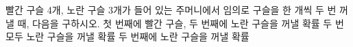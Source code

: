 빨간 구슬 4개, 노란 구슬 3개가 들어 있는 주머니에서 임의로 구슬을 한 개씩 두 번 꺼낼 때, 다음을 구하시오. 
 첫 번째에 빨간 구슬, 두 번째에 노란 구슬을 꺼낼 확률
 두 번 모두 노란 구슬을 꺼낼 확률
 두 번째에 노란 구슬을 꺼낼 확률
